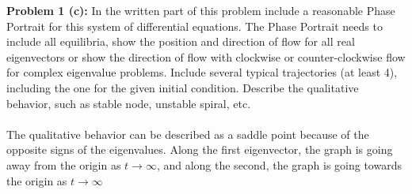 \documentclass[12pt]{article}
\begin{document}
\vspace{\baselineskip}
\vspace{\baselineskip}
\vspace{\baselineskip}

\noindent \textbf{Problem 1 (c): }In the written part of this problem include a reasonable Phase Portrait for this system of differential equations. The Phase Portrait needs to include all equilibria, show the position and direction of flow for all real eigenvectors or show the direction of flow with clockwise or counter-clockwise flow for complex eigenvalue problems. Include several typical trajectories (at least 4), including the one for the given initial condition. Describe the qualitative behavior, such as stable node, unstable spiral, etc.
\\ \\
The qualitative behavior can be described as a saddle point because of the opposite signs of the eigenvalues. Along the first eigenvector, the graph is going away from the origin as $t \rightarrow \infty$, and along the second, the graph is going towards the origin as $t \rightarrow \infty$

\newpage 
	
\end{document}
